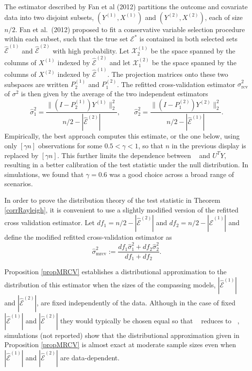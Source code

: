 \documentclass[10pt, reqno]{amsart}
\numberwithin{equation}{section}
\newcommand{\mrcv}{\mathop{\hat{\sigma}^2_{\mathrm{mrcv}}}}
\newcommand{\rcv}{\mathop{\hat{\sigma}^2_{\mathrm{rcv}}}}
\begin{document}
The estimator described by Fan et al (2012) partitions the outcome and covariate data into two disjoint subsets, $(Y^{(1)}, X^{(1)})$ and $(Y^{(2)}, X^{(2)})$, each of size $n/2$. Fan et al.~(2012) proposed to fit a conservative variable selection procedure within each subset, such that the true set $\mathcal{E}^*$ is contained in both selected sets $\hat{\mathcal{E}}^{(1)}$ and $\hat{\mathcal{E}}^{(2)}$ with high probability. Let $\mathcal{X}^{(1)}_2$ be the space spanned by the columns of $X^{(1)}$ indexed by $\hat{\mathcal{E}}^{(2)}$ and let $\mathcal{X}^{(2)}_1$ be the space spanned by the columns of $X^{(2)}$ indexed by $\hat{\mathcal{E}}^{(1)}$. The projection matrices onto these two subspaces are written $P^{(1)}_2$ and $P^{(2)}_1$. The refitted cross-validation estimator $\hat\sigma^2_{\text{rcv}}$ of $\sigma^2$ is then given by the average of the two independent estimators 
\[
\hat{\sigma}_1^2=\frac{\|(I-P^{(1)}_2)Y^{(1)}\|_2^2}{n/2-|\hat{\mathcal{E}}^{(2)}|}, \quad \quad\hat{\sigma}_2^2=\frac{{\|(I- P^{(2)}_1)Y^{(2)}\|_2^2}}{n/2-|\hat{\mathcal{E}}^{(1)}|}.
\]
Empirically, the best approach computes this estimate, or the one below, using only $[\gamma n]$ observations for some $0.5 < \gamma < 1$, so that $n$ in the previous display is replaced by $[\gamma n]$. This further limits the dependence between $\rcv$ and $U^TY$, resulting in a better calibration of the test statistic under the null distribution. In simulations, we found that $\gamma=0.6$ was a good choice across a broad range of scenarios. 

In order to prove the distribution theory of the test statistic in Theorem \ref{corrRayleigh}, it is convenient to use a slightly modified version of the refitted cross validation estimator. Let $df_1 = n/2-|\hat{\mathcal{E}}^{(2)}|$ and $df_2 = n/2-|\hat{\mathcal{E}}^{(1)}|$ and define the modified refitted cross-validation estimator as
%
\begin{equation}\label{eqMRCV}
	\hat{\sigma}^2_{\text{mrcv}}:= \frac{df_1 \hat{\sigma}^2_1 + df_2 \hat{\sigma}^2_2}{df_1 + df_2}. %
\end{equation}



Proposition \ref{propMRCV} establishes a distributional approximation to the distribution of this estimator when the sizes of the compassing models, $|\hat{\mathcal{E}}^{(1)}|$ and $|\hat{\mathcal{E}}^{(2)}|$, are fixed independently of the data. Although in the case of fixed $|\hat{\mathcal{E}}^{(1)}|$ and $|\hat{\mathcal{E}}^{(2)}|$ they would typically be chosen equal so that $\mrcv$ reduces to $\rcv$, simulations (not reported) show that the distributional approximation given in Proposition \ref{propMRCV} is almost exact at moderate sample sizes even when $|\hat{\mathcal{E}}^{(1)}|$ and $|\hat{\mathcal{E}}^{(2)}|$ are data-dependent.
\end{document}
